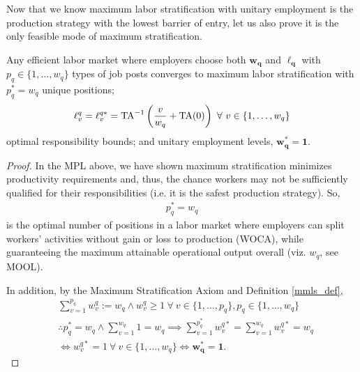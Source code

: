 \documentclass[hidelinks, nonatbib]{elsarticle}
\begin{document}
Now that we know maximum labor stratification with unitary employment is the production strategy with the lowest barrier of entry, let us also prove it is the only feasible mode of maximum stratification.

\begin{lemma}
    Any efficient labor market where employers choose both $\boldsymbol{w_q}$ and $\boldsymbol{\ell_q}$ with $p_q \in \{1, \dots, w_q\}$ types of job posts converges to maximum labor stratification with
    $
    p_{q}^{*} = w_q
    $
    unique positions;
    \begin{gather}
    \ell_{v}^{q}
    =
    \ell_{v}^{q*}
    =
    \text{TA}^{-1}\left(
        \frac{v}{w_q}
        +
        \text{TA}(0)
    \right)
    \
    \forall
    \
    v \in 
    \left\{
        1, \dots, w_q
    \right\}
    \end{gather}
    optimal responsibility bounds; and unitary employment levels,
    $
    \boldsymbol{w_{q}^{*}} =
    \boldsymbol{1}
    .
    $
    
    \begin{proof}
        In the MPL above, we have shown maximum stratification minimizes productivity requirements and, thus, the chance workers may not be sufficiently qualified for their responsibilities (i.e. it is the safest production strategy). So, 
        \begin{gather}
            p_{q}^{*} = w_q
        \end{gather}
        is the optimal number of positions in a labor market where employers can split workers' activities without gain or loss to production (WOCA), while guaranteeing the maximum attainable operational output overall (viz. $w_q$, see MOOL).
        
        In addition, by the Maximum Stratification Axiom and Definition \ref{mmls_def},
        \begin{align}
            &
            \sum_{v=1}^{p_q}{
                w_{v}^{q}
            }
            := 
            w_q
            \land
            w_{v}^{q} 
            \geq 
            1
            \
            \forall
            \
            v \in \{1, \dots, p_q\},
            p_q \in \{1, \dots, w_q\}
            \\
            &
            \therefore
            p_{q}^{*} = w_q
            \land
            \sum_{v=1}^{w_q}
            1
            =
            w_q
            \implies
            \sum_{v=1}^{p_{q}^{*}}{
                w_{v}^{q*}
            }
            =
            \sum_{v=1}^{w_q}{
                w_{v}^{q*}
            }
            =
            w_q
            \\
            &
            \iff
            w_{v}^{q*}
            =
            1
            \
            \forall
            \
            v \in \{1, \dots, w_q\}
            \iff
            \boldsymbol{w_{q}^{*}} =
            \boldsymbol{1}
            .
            \end{align}
            

\end{proof}
\end{lemma}
\end{document}
